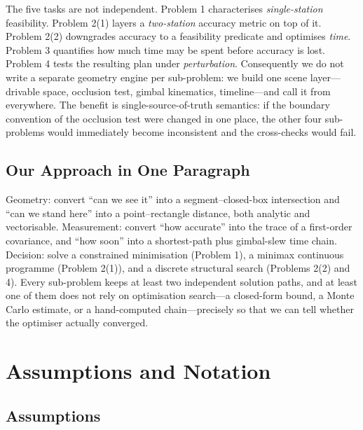 \documentclass[12pt]{article}
\begin{document}
The five tasks are not independent. Problem 1 characterises \emph{single-station} feasibility. Problem 2(1) layers a \emph{two-station} accuracy metric on top of it. Problem 2(2) downgrades accuracy to a feasibility predicate and optimises \emph{time}. Problem 3 quantifies how much time may be spent before accuracy is lost. Problem 4 tests the resulting plan under \emph{perturbation}. Consequently we do not write a separate geometry engine per sub-problem: we build one scene layer---drivable space, occlusion test, gimbal kinematics, timeline---and call it from everywhere. The benefit is single-source-of-truth semantics: if the boundary convention of the occlusion test were changed in one place, the other four sub-problems would immediately become inconsistent and the cross-checks would fail.

\subsection{Our Approach in One Paragraph}

Geometry: convert ``can we see it'' into a segment--closed-box intersection and ``can we stand here'' into a point--rectangle distance, both analytic and vectorisable. Measurement: convert ``how accurate'' into the trace of a first-order covariance, and ``how soon'' into a shortest-path plus gimbal-slew time chain. Decision: solve a constrained minimisation (Problem 1), a minimax continuous programme (Problem 2(1)), and a discrete structural search (Problems 2(2) and 4). Every sub-problem keeps at least two independent solution paths, and at least one of them does not rely on optimisation search---a closed-form bound, a Monte Carlo estimate, or a hand-computed chain---precisely so that we can tell whether the optimiser actually converged.

\section{Assumptions and Notation}

\subsection{Assumptions}
\end{document}
